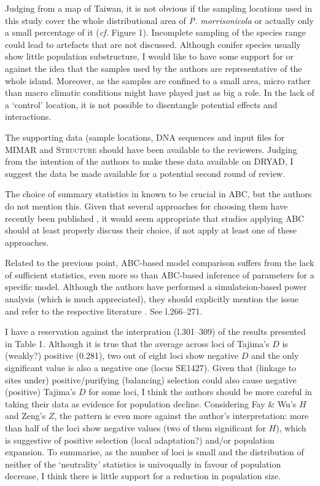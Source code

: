 \documentclass[11pt]{article}
\newenvironment{my_enumerate}
{\begin{enumerate}
  \setlength{\itemsep}{2pt}
  \setlength{\parskip}{0pt}
  \setlength{\parsep}{0pt}}
{\end{enumerate}}
\begin{document}
\begin{my_enumerate}
	\item Judging from a map of Taiwan, it is not obvious if the sampling locations used in this study cover the whole distributional area of \emph{P. morrisonicola} or actually only a small percentage of it (\emph{cf.} Figure 1). Incomplete sampling of the species range could lead to artefacts that are not discussed. Although conifer species usually show little population substructure, I would like to have some support for or against the idea that the samples used by the authors are representative of the whole island. Moreover, as the samples are confined to a small area, micro rather than macro climatic conditions might have played just as big a role. In the lack of a `control' location, it is not possible to disentangle potential effects and interactions.
	\item The supporting data (sample locations, DNA sequences and input files for \textsc{MIMAR} and \textsc{Structure} should have been available to the reviewers. Judging from the intention of the authors to make these data available on DRYAD, I suggest the data be made available for a potential second round of review.
	\item The choice of summary statistics in known to be crucial in ABC, but the authors do not mention this. Given that several approaches for choosing them have recently been published \citep[][]{Joyce:2008sf, Wegmann:2009sf, Nunes:2010fk, Fearnhead:2011uq,Aeschbacher:2011fk}, it would seem appropriate that studies applying ABC should at least properly discuss their choice, if not apply at least one of these approaches.
	\item Related to the previous point, ABC-based model comparison suffers from the lack of sufficient statistics, even more so than ABC-based inference of parameters for a specific model. Although the authors have performed a simulateion-based power analysis (which is much appreciated), they should explicitly mention the issue and refer to the respective literature \cite[\emph{e.g.}][]{Robert:2011fk}. See l.266--271.
	\item I have a reservation against the interpration (l.301--309) of the results presented in Table 1. Although it is true that the average across loci of Tajima's $D$ is (weakly?) positive (0.281), two out of eight loci show negative $D$ and the only significant value is also a negative one (locus SE1427). Given that (linkage to sites under) positive/purifying (balancing) selection could also cause negative (positive) Tajima's $D$ for some loci, I think the authors should be more careful in taking their data as evidence for population decline. Considering Fay \& Wu's $H$ and Zeng's $Z$, the pattern is even more against the author's interpretation: more than half of the loci show negative values (two of them significant for $H$), which is suggestive of positive selection (local adaptation?) and/or population expansion. To summarise, as the number of loci is small and the distribution of neither of the `neutrality' statistics is univoqually in favour of population decrease, I think there is little support for a reduction in population size.

\end{my_enumerate}
\end{document}

